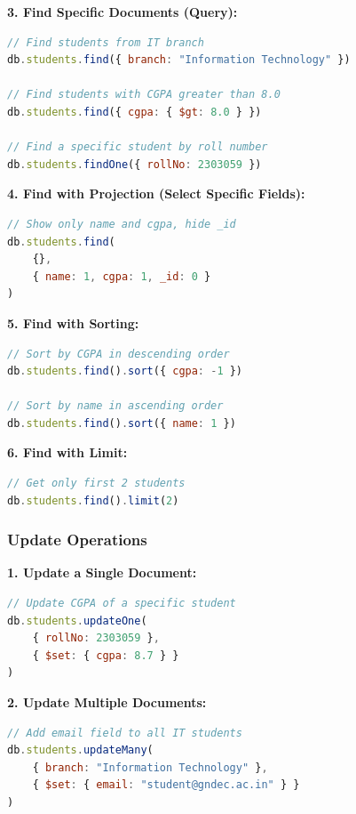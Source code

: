 \documentclass[12pt,a4paper]{article}
\begin{document}
\textbf{3. Find Specific Documents (Query):}

\begin{lstlisting}[language=JavaScript]
// Find students from IT branch
db.students.find({ branch: "Information Technology" })

// Find students with CGPA greater than 8.0
db.students.find({ cgpa: { $gt: 8.0 } })

// Find a specific student by roll number
db.students.findOne({ rollNo: 2303059 })
\end{lstlisting}

\textbf{4. Find with Projection (Select Specific Fields):}

\begin{lstlisting}[language=JavaScript]
// Show only name and cgpa, hide _id
db.students.find(
    {},
    { name: 1, cgpa: 1, _id: 0 }
)
\end{lstlisting}

\textbf{5. Find with Sorting:}

\begin{lstlisting}[language=JavaScript]
// Sort by CGPA in descending order
db.students.find().sort({ cgpa: -1 })

// Sort by name in ascending order
db.students.find().sort({ name: 1 })
\end{lstlisting}

\textbf{6. Find with Limit:}

\begin{lstlisting}[language=JavaScript]
// Get only first 2 students
db.students.find().limit(2)
\end{lstlisting}

\subsubsection{Update Operations}

\textbf{1. Update a Single Document:}

\begin{lstlisting}[language=JavaScript]
// Update CGPA of a specific student
db.students.updateOne(
    { rollNo: 2303059 },
    { $set: { cgpa: 8.7 } }
)
\end{lstlisting}

\textbf{2. Update Multiple Documents:}

\begin{lstlisting}[language=JavaScript]
// Add email field to all IT students
db.students.updateMany(
    { branch: "Information Technology" },
    { $set: { email: "student@gndec.ac.in" } }
)
\end{lstlisting}
\end{document}

